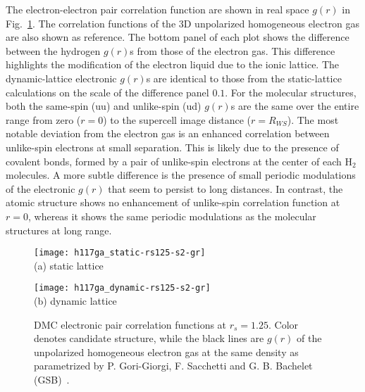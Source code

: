 The electron-electron pair correlation function are shown in real space $g(r)$ in Fig.~\ref{fig:hsolid-eegr}.
The correlation functions of the 3D unpolarized homogeneous electron gas are also shown as reference.
The bottom panel of each plot shows the difference between the hydrogen $g(r)$s from those of the electron gas.
This difference highlights the modification of the electron liquid due to the ionic lattice.
The dynamic-lattice electronic $g(r)$s are identical to those from the static-lattice calculations on the scale of the difference panel $0.1$.
For the molecular structures, both the same-spin (uu) and unlike-spin (ud) $g(r)$s are the same over the entire range from zero ($r=0$) to the supercell image distance ($r=R_{WS}$).
The most notable deviation from the electron gas is an enhanced correlation between unlike-spin electrons at small separation.
This is likely due to the presence of covalent bonds, formed by a pair of unlike-spin electrons at the center of each H$_2$ molecules.
A more subtle difference is the presence of small periodic modulations of the electronic $g(r)$ that seem to persist to long distances.
In contrast, the atomic structure shows no enhancement of unlike-spin correlation function at $r=0$, whereas it shows the same periodic modulations as the molecular structures at long range.

\begin{figure}[h]
\centering
\begin{minipage}{0.49\textwidth}
\centering
\texttt{[image: h117ga\_static-rs125-s2-gr]}\\
(a) static lattice
\end{minipage}
\begin{minipage}{0.49\textwidth}
\centering
\texttt{[image: h117ga\_dynamic-rs125-s2-gr]}\\
(b) dynamic lattice %
\end{minipage}
\caption{DMC electronic pair correlation functions at $r_s=1.25$. Color denotes candidate structure, while the black lines are $g(r)$ of the unpolarized homogeneous electron gas at the same density as parametrized by P. Gori-Giorgi, F. Sacchetti and G. B. Bachelet (GSB)~\cite{Gori-Giorgi2000}.}
\label{fig:hsolid-eegr}
\end{figure}

